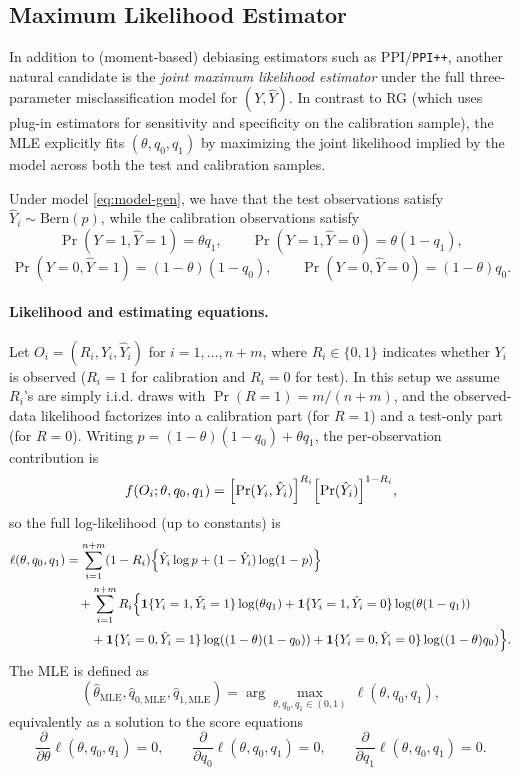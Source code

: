 \documentclass[11pt]{article}
\newcommand{\1}{\mathbf{1}}
\theoremstyle{remark}
\begin{document}
\subsection{Maximum Likelihood Estimator}
\label{subsec:full-mle}

In addition to (moment-based) debiasing estimators such as PPI/\texttt{PPI++}, another natural
candidate is the \emph{joint maximum likelihood estimator} under the full three-parameter
misclassification model for $(Y,\hat Y)$. In contrast to RG (which uses plug-in estimators for sensitivity and specificity on the calibration sample), the MLE explicitly fits $(\theta,q_0,q_1)$ by maximizing the joint
likelihood implied by the model across both the test and calibration samples.

Under model \eqref{eq:model-gen}, we have that the test observations satisfy $\hat Y_i\sim\mathrm{Bern}(p)$,
while the calibration observations satisfy
\[
\Pr(Y=1,\hat Y=1)=\theta q_1,\qquad
\Pr(Y=1,\hat Y=0)=\theta(1-q_1),
\]
\[
\Pr(Y=0,\hat Y=1)=(1-\theta)(1-q_0),\qquad
\Pr(Y=0,\hat Y=0)=(1-\theta)q_0.
\] 

\paragraph{Likelihood and estimating equations.}
Let $O_i=(R_i,Y_i,\hat Y_i)$ for $i=1,\dots,n+m$, where $R_i\in\{0,1\}$ indicates whether $Y_i$ is observed
($R_i=1$ for calibration and $R_i=0$ for test). In this setup we assume $R_i$'s are simply i.i.d. draws with 
$\Pr(R=1)=m/(n+m)$, and the observed-data likelihood factorizes into a calibration part (for $R=1$) and a
test-only part (for $R=0$). Writing $p=(1-\theta)(1-q_0)+\theta q_1$, the per-observation contribution is
\[
f(O_i;\theta,q_0,q_1)
=
\Bigl[\Pr(Y_i,\hat Y_i)\Bigr]^{R_i}\Bigl[\Pr(\hat Y_i)\Bigr]^{1-R_i},
\]
so the full log-likelihood (up to constants) is
\begin{align}
\ell(\theta,q_0,q_1)
&=
\sum_{i=1}^{n+m}(1-R_i)\Bigl\{\hat Y_i\log p+(1-\hat Y_i)\log(1-p)\Bigr\} \nonumber\\
&\quad+
\sum_{i=1}^{n+m}R_i\Bigl\{
\mathbf 1\{Y_i=1,\hat Y_i=1\}\log(\theta q_1)
+\mathbf 1\{Y_i=1,\hat Y_i=0\}\log(\theta(1-q_1)) \nonumber\\
&\qquad
+\mathbf 1\{Y_i=0,\hat Y_i=1\}\log((1-\theta)(1-q_0))
+\mathbf 1\{Y_i=0,\hat Y_i=0\}\log((1-\theta)q_0)
\Bigr\}.
\label{eq:mle-loglik-R}
\end{align}
The MLE is defined as
\[
(\hat\theta_{\mathrm{MLE}},\hat q_{0,\mathrm{MLE}},\hat q_{1,\mathrm{MLE}})
=
\arg\max_{\theta,q_0,q_1\in(0,1)}\ \ell(\theta,q_0,q_1),
\]
equivalently as a solution to the score equations
\[
\frac{\partial}{\partial\theta}\ell(\theta,q_0,q_1)=0,\qquad
\frac{\partial}{\partial q_0}\ell(\theta,q_0,q_1)=0,\qquad
\frac{\partial}{\partial q_1}\ell(\theta,q_0,q_1)=0.
\]
\end{document}
